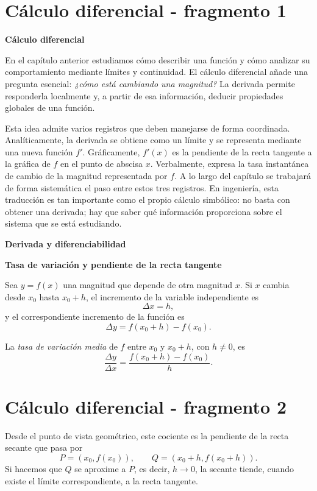 
\section{Cálculo diferencial - fragmento 1}
\textbf{Cálculo diferencial}

En el capítulo anterior estudiamos cómo describir una función y cómo analizar su comportamiento mediante límites y continuidad. El cálculo diferencial añade una pregunta esencial: \emph{¿cómo está cambiando una magnitud?} La derivada permite responderla localmente y, a partir de esa información, deducir propiedades globales de una función.

Esta idea admite varios registros que deben manejarse de forma coordinada. Analíticamente, la derivada se obtiene como un límite y se representa mediante una nueva función $f'$. Gráficamente, $f'(x)$ es la pendiente de la recta tangente a la gráfica de $f$ en el punto de abscisa $x$. Verbalmente, expresa la tasa instantánea de cambio de la magnitud representada por $f$. A lo largo del capítulo se trabajará de forma sistemática el paso entre estos tres registros. En ingeniería, esta traducción es tan importante como el propio cálculo simbólico: no basta con obtener una derivada; hay que saber qué información proporciona sobre el sistema que se está estudiando.

\textbf{Derivada y diferenciabilidad}

\textbf{Tasa de variación y pendiente de la recta tangente}

Sea $y=f(x)$ una magnitud que depende de otra magnitud $x$. Si $x$ cambia desde $x_0$ hasta $x_0+h$, el incremento de la variable independiente es
\[
\Delta x=h,
\]
y el correspondiente incremento de la función es
\[
\Delta y=f(x_0+h)-f(x_0).
\]

\begin{definition}
La \emph{tasa de variación media} de $f$ entre $x_0$ y $x_0+h$, con $h\neq0$, es
\[
\frac{\Delta y}{\Delta x}
=
\frac{f(x_0+h)-f(x_0)}{h}.
\]
\end{definition}


\section{Cálculo diferencial - fragmento 2}
Desde el punto de vista geométrico, este cociente es la pendiente de la recta secante que pasa por
\[
P=(x_0,f(x_0)),
\qquad
Q=(x_0+h,f(x_0+h)).
\]
Si hacemos que $Q$ se aproxime a $P$, es decir, $h\to0$, la secante tiende, cuando existe el límite correspondiente, a la recta tangente.

